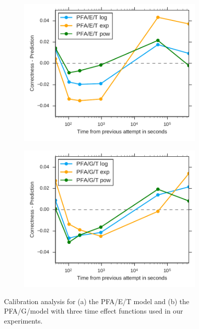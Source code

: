 \begin{figure}[htbp]
  \centering
  \begin{subfigure}{.49\textwidth}
    \centering
    \includegraphics[width=\textwidth]{img/calibration-pfaet}
    \caption{}
    \label{fig:calibration-pfaet}
  \end{subfigure}
  \begin{subfigure}{.49\textwidth}
    \centering
    \includegraphics[width=\textwidth]{img/calibration-pfagt}
    \caption{}
    \label{fig:calibration-pfagt}
  \end{subfigure}
  \caption{Calibration analysis for (a) the PFA/E/T model and (b) the PFA/G/model with three time effect functions used in our experiments.}
  \label{fig:calibration2}
\end{figure}

